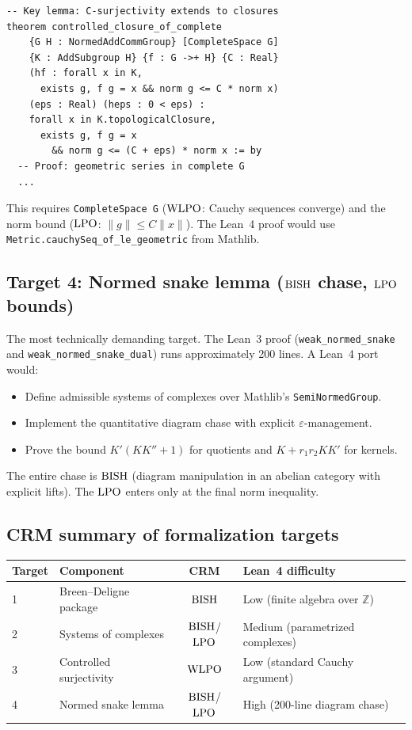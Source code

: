 \documentclass[11pt,a4paper]{article}
\theoremstyle{plain}
\theoremstyle{definition}
\newcommand{\BISH}{\textup{BISH}}
\newcommand{\WLPO}{\textup{WLPO}}
\newcommand{\LPO}{\textup{LPO}}
\newcommand{\Z}{\mathbb{Z}}
\begin{document}
\begin{verbatim}
-- Key lemma: C-surjectivity extends to closures
theorem controlled_closure_of_complete
    {G H : NormedAddCommGroup} [CompleteSpace G]
    {K : AddSubgroup H} {f : G ->+ H} {C : Real}
    (hf : forall x in K,
      exists g, f g = x && norm g <= C * norm x)
    (eps : Real) (heps : 0 < eps) :
    forall x in K.topologicalClosure,
      exists g, f g = x
        && norm g <= (C + eps) * norm x := by
  -- Proof: geometric series in complete G
  ...
\end{verbatim}

This requires \texttt{CompleteSpace G} ($\WLPO$: Cauchy sequences
converge) and the norm bound ($\LPO$: $\|g\| \leq C\|x\|$).
The Lean~4 proof would use \texttt{Metric.cauchySeq\_of\_le\_geometric}
from Mathlib.

\subsection{Target 4: Normed snake lemma ($\BISH$ chase, $\LPO$ bounds)}

The most technically demanding target.  The Lean~3 proof
(\texttt{weak\_normed\_snake} and \texttt{weak\_normed\_snake\_dual})
runs approximately 200 lines.  A Lean~4 port would:
\begin{itemize}[nosep]
\item Define admissible systems of complexes over Mathlib's
  \texttt{SemiNormedGroup}.
\item Implement the quantitative diagram chase with explicit
  $\varepsilon$-management.
\item Prove the bound $K'(KK''+1)$ for quotients and
  $K + r_1 r_2 K K'$ for kernels.
\end{itemize}

The entire chase is $\BISH$ (diagram manipulation in an abelian
category with explicit lifts).  The $\LPO$ enters only at the
final norm inequality.

\subsection{CRM summary of formalization targets}

\begin{center}
\begin{tabular}{llcl}
\toprule
\textbf{Target} & \textbf{Component} & \textbf{CRM} & \textbf{Lean~4 difficulty} \\
\midrule
1 & Breen--Deligne package  & $\BISH$ & Low (finite algebra over $\Z$) \\
2 & Systems of complexes    & $\BISH$/$\LPO$ & Medium (parametrized complexes) \\
3 & Controlled surjectivity & $\WLPO$ & Low (standard Cauchy argument) \\
4 & Normed snake lemma      & $\BISH$/$\LPO$ & High (200-line diagram chase) \\
\bottomrule
\end{tabular}
\end{center}
\end{document}
